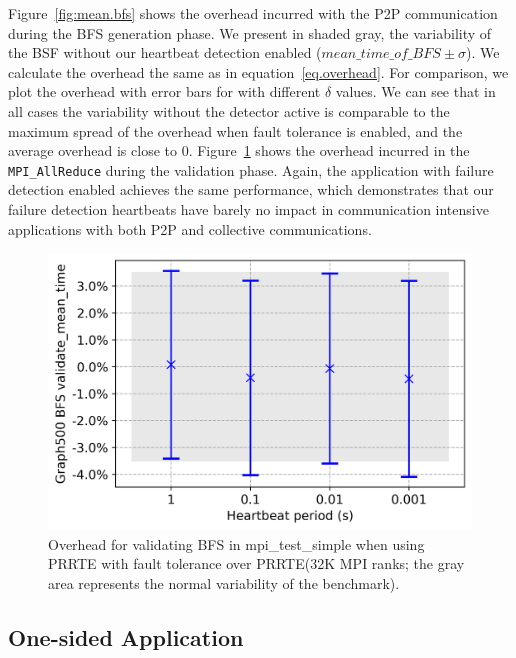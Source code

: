 \documentclass[5p,times,twocolumn]{elsarticle}
\newcommand{\mpifunc}[1]{\lstinline"MPI_#1"\xspace}
\newcommand{\prrte}[0]{\textsc{PRRTE}\xspace}
\newcommand{\mpi}[0]{\textsc{MPI}\xspace}
\begin{document}
Figure~\ref{fig:mean.bfs} shows the overhead incurred with the P2P communication during the BFS generation phase.
We present in shaded gray, the variability of the BSF without our heartbeat detection enabled ($mean\_time\_of\_BFS \pm \sigma$).
We calculate the overhead the same as in equation~\eqref{eq.overhead}. For comparison, we plot the overhead with error bars for with different $\delta$ values.
We can see that in all cases the variability without the detector active is comparable to the maximum spread of the overhead when fault tolerance is enabled, and the average overhead is close to 0.
Figure~\ref{fig:validate.bfs} shows the overhead incurred in the \mpifunc{AllReduce} during the validation phase.
Again, the application with failure detection enabled achieves the same performance, which demonstrates that our failure detection heartbeats have barely no impact in communication intensive applications with both P2P and collective communications.

\begin{figure}[h]
  \centering
  \includegraphics[width=\linewidth]{new_validate_bfs.png}
  \caption{Overhead for validating BFS in mpi\_test\_simple when using \prrte with fault tolerance over \prrte (32K \mpi ranks; the gray area represents the normal variability of the benchmark).}
  \label{fig:validate.bfs}
\end{figure}


\subsection{One-sided Application}
\end{document}
